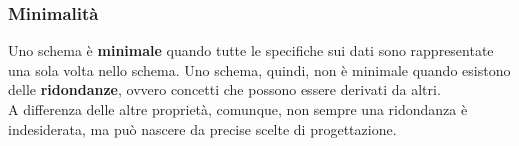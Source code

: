 \subsubsection{Minimalità}
Uno schema è \textbf{minimale} quando tutte le specifiche sui dati sono rappresentate una sola volta nello schema. Uno schema, quindi, non è minimale quando esistono delle \textbf{ridondanze}, ovvero concetti che possono essere derivati da altri.\\
A differenza delle altre proprietà, comunque, non sempre una ridondanza è indesiderata, ma può nascere da precise scelte di progettazione.